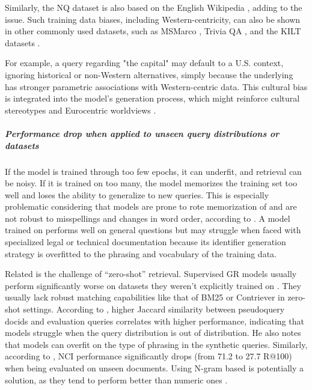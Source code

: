 Similarly, the NQ dataset is also based on the English Wikipedia \cite{kwiatkowski-natural-questions}, adding to the issue. Such training data biases, including Western-centricity, can also be shown in other commonly used datasets, such as MSMarco \cite{payal-bajaj-ms-marco}, Trivia QA \cite{joshi-triviaqa-a}, and the KILT datasets \cite{fabio-petroni-kilt-a}.

For example, a query regarding "the capital" may default to a U.S. context, ignoring historical or non-Western alternatives, simply because the underlying  has stronger parametric associations with Western-centric data. This cultural bias is integrated into the model's generation process, which might reinforce cultural stereotypes and Eurocentric worldviews \cite{gallegos-bias-and}.

\subparagraph{Performance drop when applied to unseen query distributions or datasets}
If the model is trained through too few epochs, it can underfit, and retrieval can be noisy. If it is trained on too many, the model memorizes the training set too well and loses the ability to generalize to new queries. This is especially problematic considering that  models are prone to rote memorization of  and are not robust to misspellings and changes in word order, according to \citet{yuan-liu-on-the}. A model trained on  performs well on general questions but may struggle when faced with specialized legal or technical documentation because its identifier generation strategy is overfitted to the phrasing and vocabulary of the training data.

Related is the challenge of ``zero-shot'' retrieval. Supervised GR models usually perform significantly worse on datasets they weren't explicitly trained on \cite{yuan-liu-on-the,zhen-zhang-replication-and}. They usually lack robust matching capabilities like that of BM25 or Contriever \cite{izacard-contriever} in zero-shot settings. According to \citet{ronak-pradeep-how-does}, higher Jaccard similarity between pseudoquery docids and evaluation queries correlates with higher performance, indicating that models struggle when the query distribution is out of distribution. He also notes that models can overfit on the type of phrasing in the synthetic queries. Similarly, according to \citet{yuan-liu-on-the}, NCI \cite{yujing-wang-a-neural} performance significantly drops (from 71.2 to 27.7 R@100) when being evaluated on unseen documents.
Using N-gram based  is potentially a solution, as they tend to perform better than numeric ones \cite{michele-bevilacqua-autoregressive-search}.

